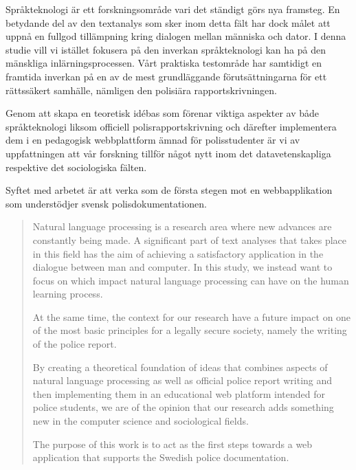 \documentclass[swedish]{maucsthesis}
\begin{document}

\author{Kalle Lindqvist \and Henrik Svensson}

\subject{datavetenskap}


\maketitle %

\begin{sammanfattning}
  Språkteknologi är ett forskningsområde vari det ständigt görs nya framsteg. En
  betydande del av den textanalys som sker inom detta fält har dock målet att
  uppnå en fullgod tillämpning kring dialogen mellan människa och dator. I denna
  studie vill vi istället fokusera på den inverkan språkteknologi kan ha på den
  mänskliga inlärningsprocessen. Vårt praktiska testområde har samtidigt en
  framtida inverkan på en av de mest grundläggande förutsättningarna för ett
  rättssäkert samhälle, nämligen den polisiära rapportskrivningen.

  Genom att skapa en teoretisk idébas som förenar viktiga aspekter av både
  språkteknologi liksom officiell polisrapportskrivning och därefter
  implementera dem i en pedagogisk webbplattform ämnad för polisstudenter är vi
  av uppfattningen att vår forskning tillför något nytt inom det
  datavetenskapliga respektive det sociologiska fälten.

  Syftet med arbetet är att verka som de första stegen mot en webbapplikation som understödjer svensk polisdokumentationen.
\end{sammanfattning}

\begin{abstract}
  Natural language processing is a research area where new advances are
  constantly being made. A significant part of text analyses that takes place in
  this field has the aim of achieving a satisfactory application in the dialogue
  between man and computer. In this study, we instead want to focus on which
  impact natural language processing can have on the human learning process.

  At the same time, the context for our research have a future impact on one of
  the most basic principles for a legally secure society, namely the writing of
  the police report.

  By creating a theoretical foundation of ideas that combines aspects of natural
  language processing as well as official police report writing and then
  implementing them in an educational web platform intended for police students,
  we are of the opinion that our research adds something new in the computer
  science and sociological fields.

  The purpose of this work is to act as the first steps towards a web
  application that supports the Swedish police documentation.
\end{abstract}
\end{document}
